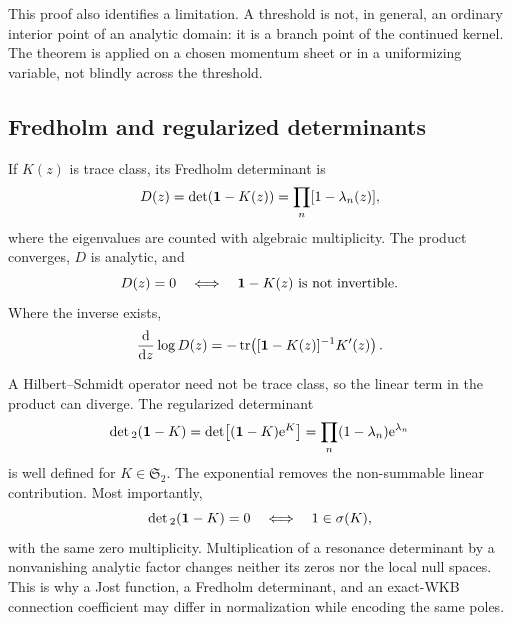This proof also identifies a limitation.  A threshold is not, in general, an
ordinary interior point of an analytic domain: it is a branch point of the
continued kernel.  The theorem is applied on a chosen momentum sheet or in a
uniformizing variable, not blindly across the threshold.

\subsection{Fredholm and regularized determinants}
\label{subsec:fredholm-determinants}

If $K(z)$ is trace class, its Fredholm determinant is
\begin{equation}
  D(z)=\det(\mathbf{1}-K(z))
  =\prod_n[1-\lambda_n(z)],
  \label{eq:fredholm-determinant}
\end{equation}
where the eigenvalues are counted with algebraic multiplicity.  The product
converges, $D$ is analytic, and
\begin{equation}
  D(z)=0
  \quad\Longleftrightarrow\quad
  \mathbf{1}-K(z)\text{ is not invertible}.
  \label{eq:fredholm-zero}
\end{equation}
Where the inverse exists,
\begin{equation}
  \frac{\mathrm{d}}{\mathrm{d} z}\log D(z)
  =-\operatorname{tr}\!\left([\mathbf{1}-K(z)]^{-1}K'(z)\right).
  \label{eq:fredholm-log-derivative}
\end{equation}

A Hilbert--Schmidt operator need not be trace class, so the linear term in
the product can diverge.  The regularized determinant
\begin{equation}
  \det{}_2(\mathbf{1}-K)
  =\det\bigl[(\mathbf{1}-K)\mathrm{e}^K\bigr]
  =\prod_n(1-\lambda_n)\mathrm{e}^{\lambda_n}
  \label{eq:det2-definition}
\end{equation}
is well defined for $K\in\mathfrak S_2$.  The exponential removes the
non-summable linear contribution.  Most importantly,
\begin{equation}
  \det{}_2(\mathbf{1}-K)=0
  \quad\Longleftrightarrow\quad
  1\in\sigma(K),
  \label{eq:det2-zero}
\end{equation}
with the same zero multiplicity.  Multiplication of a resonance determinant
by a nonvanishing analytic factor changes neither its zeros nor the local
null spaces.  This is why a Jost function, a Fredholm determinant, and an
exact-WKB connection coefficient may differ in normalization while encoding
the same poles.

